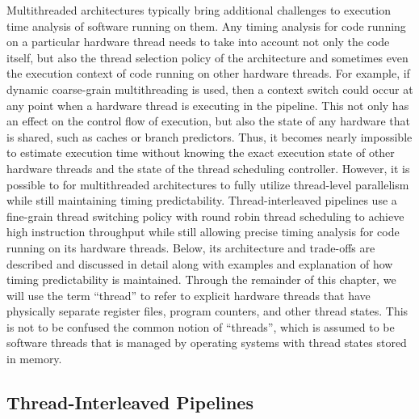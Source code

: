 Multithreaded architectures typically bring additional challenges to execution time analysis of software running on them.
Any timing analysis for code running on a particular hardware thread needs to take into account not only the code itself, but also the thread selection policy of the architecture and sometimes even the execution context of code running on other hardware threads.
For example, if dynamic coarse-grain multithreading is used, then a context switch could occur at any point when a hardware thread is executing in the pipeline.
This not only has an effect on the control flow of execution, but also the state of any hardware that is shared, such as caches or branch predictors.    
Thus, it becomes nearly impossible to estimate execution time without knowing the exact execution state of other hardware threads and the state of the thread scheduling controller.
However, it is possible to for multithreaded architectures to fully utilize thread-level parallelism while still maintaining timing predictability.
Thread-interleaved pipelines use a fine-grain thread switching policy with round robin thread scheduling to achieve high instruction throughput while still allowing precise timing analysis for code running on its hardware threads. 
Below, its architecture and trade-offs are described and discussed in detail along with examples and explanation of how timing predictability is maintained.
Through the remainder of this chapter, we will use the term ``thread'' to refer to explicit hardware threads that have physically separate register files, program counters, and other thread states.
This is not to be confused the common notion of ``threads'', which is assumed to be software threads that is managed by operating systems with thread states stored in memory.

\subsection{Thread-Interleaved Pipelines}
\label{subsection:pret_thread_pipeline}

